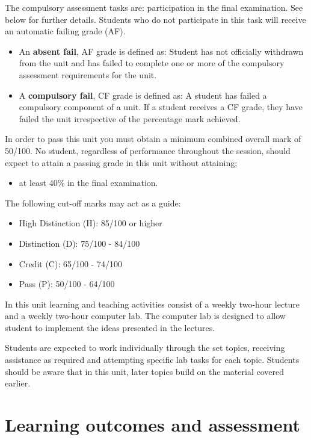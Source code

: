 \documentclass[a4paper,oneside]{book}
\begin{document}
The compulsory assessment tasks are: participation in the final
examination. See below for further details. Students who do not
participate in this task will receive an automatic failing grade
(AF).
\begin{itemize}

\item An \textbf{absent fail}, AF grade is defined as: Student has not
officially withdrawn from the unit and has failed to complete one or
more of the compulsory assessment requirements for the unit.

\item A \textbf{compulsory fail}, CF grade is defined as: A student has
failed a compulsory component of a unit. If a student receives a CF
grade, they have failed the unit irrespective of the percentage mark
achieved.
\end{itemize}
In order to pass this unit you must obtain a minimum combined overall
mark of 50/100. No student, regardless of performance throughout the
session, should expect to attain a passing grade in this unit without
attaining;
\begin{itemize}
\item at least 40\% in the final examination.
\end{itemize}
The following cut-off marks may act as a guide:
\begin{itemize}
\item High Distinction (H):            85/100 or higher
\item Distinction (D):                 75/100 - 84/100
\item Credit (C):                      65/100 - 74/100
\item Pass (P):                        50/100 - 64/100
\end{itemize}
In this unit learning and teaching activities consist of a weekly
two-hour lecture and a weekly two-hour computer lab. The computer lab
is designed to allow student to implement the ideas presented in the
lectures.



Students are expected to work individually through the set topics,
receiving assistance as required and attempting specific lab
tasks for each topic. Students should be aware that in this unit,
later topics build on the material covered earlier.


\section{Learning outcomes and assessment}
\end{document}
